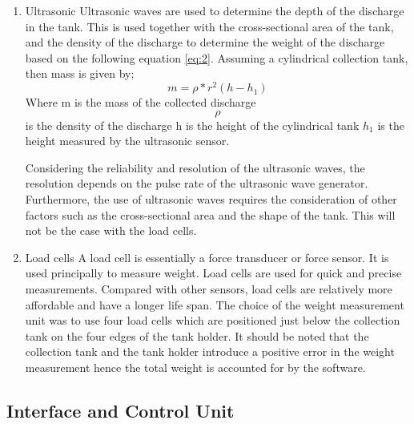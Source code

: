 \begin{enumerate}
    \item Ultrasonic \newline
    Ultrasonic waves are used to determine the depth of the discharge in the tank. This is used together with the cross-sectional area of the tank, and the density of the discharge to determine the weight of the discharge based on the following equation \ref{eq:2}.
    Assuming a cylindrical collection tank, then mass is given by;
    \begin{equation}
     m= \rho*r^2 (h- h_1 )
    \label{eq:2}
    \end{equation}
    Where m is the mass of the collected discharge\newline $$\rho$$ is the density of the discharge\newline
    h is the height of the cylindrical tank \newline 
    $h_1$ is the height measured by the ultrasonic sensor.
    
    Considering the reliability and resolution of the ultrasonic waves, the resolution depends on the pulse rate of the ultrasonic wave generator. Furthermore, the use of ultrasonic waves requires the consideration of other factors such as the cross-sectional area and the shape of the tank. This will not be the case with the load cells.

    \item Load cells \newline
    A load cell is essentially a force transducer or force sensor. It is used principally to measure weight. Load cells are used for quick and precise measurements. Compared with other sensors, load cells are relatively more affordable and have a longer life span.
    The choice of the weight measurement unit was to use four load cells which are positioned just below the collection tank on the four edges of the tank holder. It should be noted that the collection tank and the tank holder introduce a positive error in the weight measurement hence the total weight is accounted for by the software. 
\end{enumerate}


\subsection{Interface and Control Unit}
